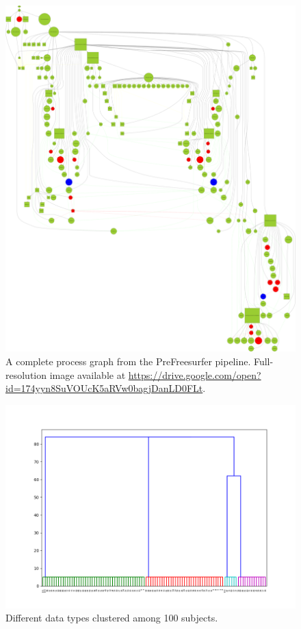 \documentclass[a4paper,num-refs]{oup-contemporary}
\begin{document}
\begin{figure}
\centering
  \includegraphics[width=.9\textwidth]{images/graph}
  \caption{A complete process graph from the PreFreesurfer pipeline.
Full-resolution image available at \url{https://drive.google.com/open?id=174yyn8SuVOUcK5aRVw0bagjDanLD0FLt}.}
  \label{fig:complete-graph}
\end{figure}

\begin{figure}
\centering
  \includegraphics[width=.8\textwidth]{images/hclusters}
  \caption{Different data types clustered among 100 subjects.}
  \label{fig:subj-clusters}
\end{figure}





\end{document}
